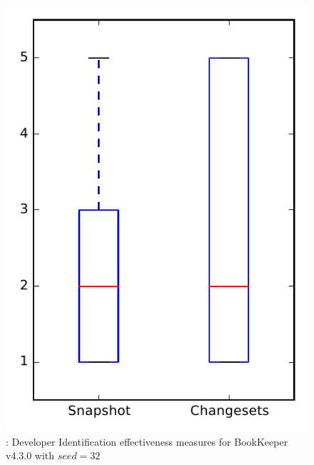 
\begin{figure}
\centering
\includegraphics[height=0.4\textheight]{figures/dit_seed/rq1_bookkeeper_32}
\caption{\rtwo: Developer Identification effectiveness measures for BookKeeper v4.3.0 with $seed=32$}
\label{fig:dit_seed:rq1:bookkeeper}
\end{figure}
